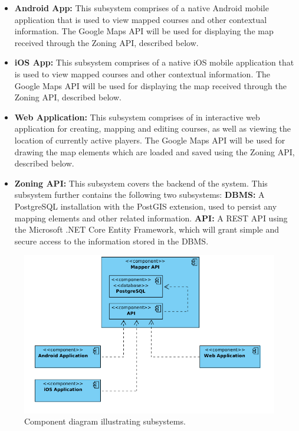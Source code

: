 \documentclass{article}
\begin{document}
    \begin{itemize}
        \item \textbf{Android App:} This subsystem comprises of a native
            Android mobile application that is used to view mapped courses and
            other contextual information. The Google Maps API will be used for
            displaying the map received through the Zoning API, described
            below.
        \item \textbf{iOS App:} This subsystem comprises of a native iOS mobile
            application that is used to view mapped courses and other
            contextual information. The Google Maps API will be used for
            displaying the map received through the Zoning API, described
            below.
        \item \textbf{Web Application:} This subsystem comprises of in
            interactive web application for creating, mapping and editing
            courses, as well as viewing the location of currently active
            players. The Google Maps API will be used for drawing the map
            elements which are loaded and saved using the Zoning API, described
            below.
        \item \textbf{Zoning API:} This subsystem covers the backend of the
            system. This subsystem further contains the following two
            subsystems:
            \subitem \textbf{DBMS:} A PostgreSQL installation with the PostGIS
            extension, used to persist any mapping elements and other related
            information.
            \subitem \textbf{API:} A REST API using the Microsoft .NET Core
            Entity Framework, which will grant simple and secure access to the
            information stored in the DBMS.
    \end{itemize}

    \begin{figure}[h!]
        \centering
        \includegraphics[scale=0.45]{ComponentDiagram}
        \caption{Component diagram illustrating subsystems.}
        \label{fig:component}
    \end{figure}
\end{document}
